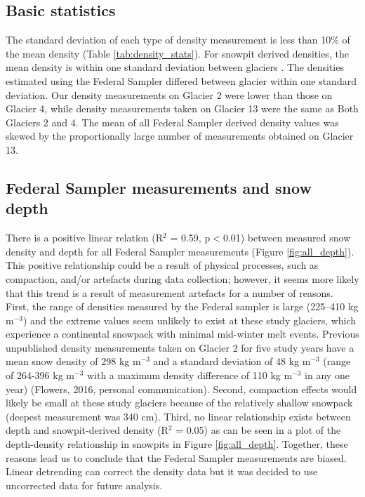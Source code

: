 \documentclass{sfuthesis}
\begin{document}
\subsection{Basic statistics}

The standard deviation of each type of density measurement is less than 10\% of the mean density (Table \ref{tab:density_stats}). For snowpit derived densities, the mean density is within one standard deviation between glaciers . The densities estimated using the Federal Sampler differed between glacier within one standard deviation. Our density measurements on Glacier 2 were lower than those on Glacier 4, while density measurements taken on Glacier 13 were the same as Both Glaciers 2 and 4. The mean of all Federal Sampler derived density values was skewed by the proportionally large number of measurements obtained on Glacier 13.

\subsection{Federal Sampler measurements and snow depth}
\label{sec:FSdensity&depth}

There is a positive linear relation (R$^2$ = 0.59, p$<$0.01) between measured snow density and depth for all Federal Sampler measurements (Figure \ref{fig:all_depth}). This positive relationship could be a result of physical processes, such as compaction, and/or artefacts during data collection; however, it seems more likely that this trend is a result of measurement artefacts for a number of reasons. First, the range of densities measured by the Federal sampler is large (225--410 kg m$^{-3}$) and the extreme values seem unlikely to exist at these study glaciers, which experience a continental snowpack with minimal mid-winter melt events. Previous unpublished density measurements taken on Glacier 2 for five study years have a mean snow density of 298 kg m$^{-3}$ and a standard deviation of 48 kg m$^{-3}$ (range of 264-396 kg m$^{-3}$ with a maximum density difference of 110 kg m$^{-3}$ in any one year) (Flowers, 2016, personal communication). Second, compaction effects would likely be small at these study glaciers because of the relatively shallow snowpack (deepest measurement was 340 cm). Third, no linear relationship exists between depth and snowpit-derived density (R$^2$ = 0.05) as can be seen in a plot of the depth-density relationship in snowpits in Figure \ref{fig:all_depth}. Together, these reasons lead us to conclude that the Federal Sampler measurements are biased. Linear detrending can correct the density data but it was decided to use uncorrected data for future analysis.
\end{document}
